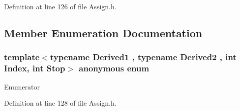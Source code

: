 Definition at line 126 of file Assign.\-h.



\subsection{Member Enumeration Documentation}
\hypertarget{structei__assign__novec___complete_unrolling_a1ad384b484571d58d73fc926693799b1}{\subsubsection[{anonymous enum}]{\setlength{\rightskip}{0pt plus 5cm}template$<$typename Derived1 , typename Derived2 , int Index, int Stop$>$ anonymous enum}}\label{structei__assign__novec___complete_unrolling_a1ad384b484571d58d73fc926693799b1}
\begin{Desc}
\item[Enumerator]\par
\begin{description}
\item[{\em 
\hypertarget{structei__assign__novec___complete_unrolling_a1ad384b484571d58d73fc926693799b1ad4b7cd43f6a0986dd6d8c37f6ee48a3c}{row}\label{structei__assign__novec___complete_unrolling_a1ad384b484571d58d73fc926693799b1ad4b7cd43f6a0986dd6d8c37f6ee48a3c}
}]\item[{\em 
\hypertarget{structei__assign__novec___complete_unrolling_a1ad384b484571d58d73fc926693799b1ae2b482a137635b949ea26ce0b00985cc}{col}\label{structei__assign__novec___complete_unrolling_a1ad384b484571d58d73fc926693799b1ae2b482a137635b949ea26ce0b00985cc}
}]\end{description}
\end{Desc}


Definition at line 128 of file Assign.\-h.



